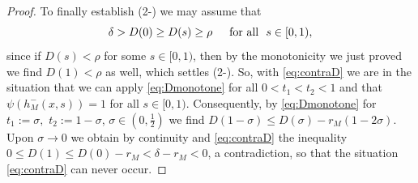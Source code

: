 \begin{proof}
To finally establish (2-) we may
assume that 
\begin{equation}\label{eq:contraD}
\delta>D(0)\ge D(s)\ge\rho\quad\,\,\,\text{for all }\,\,
s\in [0,1),
\end{equation}
since if $D(s)<\rho$ for
some $s\in [0,1)$, then by the monotonicity we just proved we find $D(1)<\rho$ as well,
which settles (2-).
So, with \eqref{eq:contraD}
we are in the situation that we can apply \eqref{eq:Dmonotone}
for all $0<t_1<t_2<1$ and that $\psi(h_M^-(x,s))= 1$ for all $s\in [0,1)$.
Consequently, by \eqref{eq:Dmonotone} for $t_1:=\sigma,$ $t_2:=1-\sigma$, $\sigma\in (0,\frac12)$ we find $D(1-\sigma)\le D(\sigma)-r_M(1-2\sigma).$ Upon $\sigma\to 0$ we obtain
by continuity and \eqref{eq:contraD} the inequality
$
0\le D(1)\le D(0)-r_M <\delta-r_M<0$, a contradiction, so that the situation 
\eqref{eq:contraD}  can never occur.
\end{proof}



